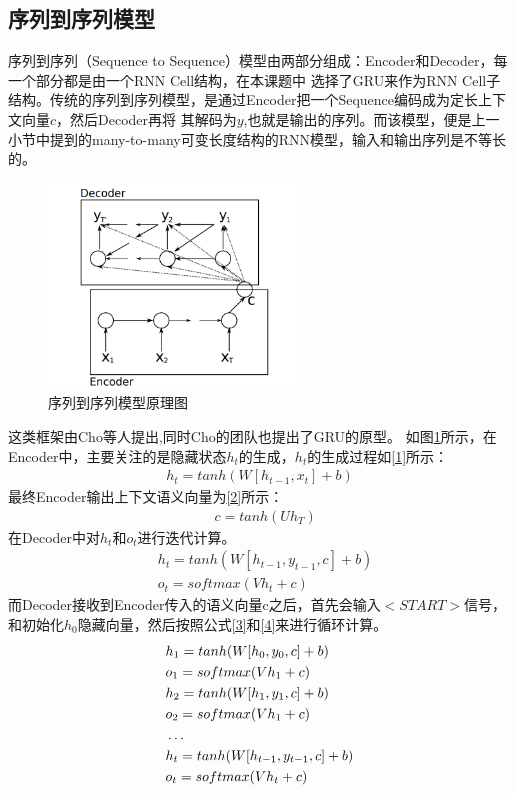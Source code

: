 \documentclass[supercite]{HustGraduPaper}
\theoremstyle{definition}
\begin{document}
\subsection{序列到序列模型}
序列到序列（Sequence to Sequence）模型由两部分组成：Encoder和Decoder，每一个部分都是由一个RNN Cell结构，在本课题中
选择了GRU来作为RNN Cell子结构。传统的序列到序列模型，是通过Encoder把一个Sequence编码成为定长上下文向量$c$，然后Decoder再将
其解码为$y$,也就是输出的序列。而该模型，便是上一小节中提到的many-to-many可变长度结构的RNN模型，输入和输出序列是不等长的。
\begin{figure}[htbp] %
  \centering %
  \includegraphics[width=0.6\textwidth]{images/seq2seq.png} %
  \caption{序列到序列模型原理图} %
  \label{Fig.seq2seq} %
\end{figure}
这类框架由Cho\cite{cho2014learning}等人提出,同时Cho的团队也提出了GRU的原型。
如图\ref{Fig.seq2seq}所示，在Encoder中，主要关注的是隐藏状态$h_t$的生成，$h_t$的生成过程如\ref{1}所示：
\begin{align}
  h_t = tanh(W[h_{t-1},x_t] + b) \label{1}
\end{align}
最终Encoder输出上下文语义向量为\ref{2}所示：
\begin{align}
  &c = tanh(Uh_T) \label{2}
\end{align}
在Decoder中对$h_t$和$o_t$进行迭代计算。
\begin{align}
  &h_t = tanh(W[h_{t-1},y_{t-1},c] + b) \label{3}\\
  &o_t = softmax(Vh_t + c) \label{4}
\end{align}
而Decoder接收到Encoder传入的语义向量c之后，首先会输入$<START>$信号，和初始化$h_0$隐藏向量，然后按照公式\ref{3}和\ref{4}来进行循环计算。
\begin{align}
  &h_1 = tanh(W[h_0,y_0,c] + b)\notag\\
  &o_1 = softmax(Vh_1 + c)\notag\\
  &h_2 = tanh(W[h_1,y_1,c] + b)\notag\\
  &o_2 = softmax(Vh_1 + c)\notag\\
  &\dots\notag\\
  &h_t = tanh(W[h_{t-1},y_{t-1},c] + b)\notag\\
  &o_t = softmax(Vh_t + c)\notag
\end{align}
\end{document}
